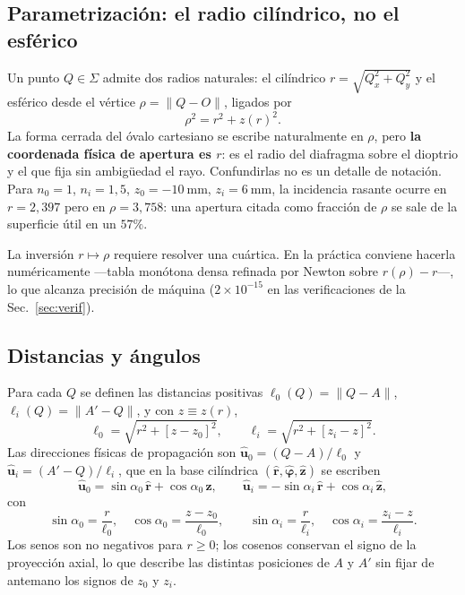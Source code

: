 \documentclass[11pt,a4paper]{article}
\newcommand{\ux}{\hat{\mathbf{u}}}
\newcommand{\rhat}{\hat{\mathbf{r}}}
\newcommand{\phihat}{\hat{\boldsymbol{\varphi}}}
\newcommand{\zhat}{\hat{\mathbf{z}}}
\begin{document}
\subsection{Parametrización: el radio cilíndrico, no el esférico}
\label{sec:param}

Un punto $Q\in\Sigma$ admite dos radios naturales: el cilíndrico
$r=\sqrt{Q_x^2+Q_y^2}$ y el esférico desde el vértice
$\rho=\|Q-O\|$, ligados por
\begin{equation}
  \rho^2 = r^2 + z(r)^2 .
  \label{eq:rho_r}
\end{equation}
La forma cerrada del óvalo cartesiano se escribe naturalmente en $\rho$, pero
\textbf{la coordenada física de apertura es $r$}: es el radio del diafragma
sobre el dioptrio y el que fija sin ambigüedad el rayo. Confundirlas no es un
detalle de notación. Para $n_0=1$, $n_i=1{,}5$, $z_0=\SI{-10}{\milli\meter}$,
$z_i=\SI{6}{\milli\meter}$, la incidencia rasante ocurre en $r=2{,}397$ pero
en $\rho=3{,}758$: una apertura citada como fracción de $\rho$ se sale de la
superficie útil en un $57\%$.

La inversión $r\mapsto\rho$ requiere resolver una cuártica. En la práctica
conviene hacerla numéricamente ---tabla monótona densa refinada por Newton
sobre $r(\rho)-r$---, lo que alcanza precisión de máquina ($2\times10^{-15}$
en las verificaciones de la Sec.~\ref{sec:verif}).

\subsection{Distancias y ángulos}

Para cada $Q$ se definen las distancias positivas
$\ell_0(Q)=\|Q-A\|$, $\ell_i(Q)=\|A'-Q\|$, y con
$z\equiv z(r)$,
\begin{equation}
  \ell_0=\sqrt{r^2+[z-z_0]^2},\qquad
  \ell_i=\sqrt{r^2+[z_i-z]^2}.
\end{equation}
Las direcciones físicas de propagación son
$\ux_0=(Q-A)/\ell_0$ y $\ux_i=(A'-Q)/\ell_i$, que en la base cilíndrica
$(\rhat,\phihat,\zhat)$ se escriben
\begin{equation}
  \ux_0=\sin\alpha_0\,\rhat+\cos\alpha_0\,\zhat,\qquad
  \ux_i=-\sin\alpha_i\,\rhat+\cos\alpha_i\,\zhat,
\end{equation}
con
\begin{equation}
  \sin\alpha_0=\frac{r}{\ell_0},\quad
  \cos\alpha_0=\frac{z-z_0}{\ell_0},\qquad
  \sin\alpha_i=\frac{r}{\ell_i},\quad
  \cos\alpha_i=\frac{z_i-z}{\ell_i}.
\end{equation}
Los senos son no negativos para $r\ge0$; los cosenos conservan el signo de la
proyección axial, lo que describe las distintas posiciones de $A$ y $A'$ sin
fijar de antemano los signos de $z_0$ y $z_i$.
\end{document}
